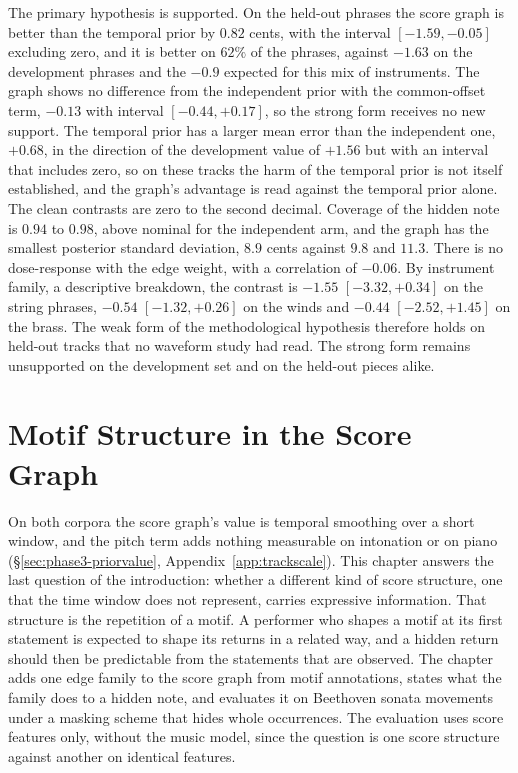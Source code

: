 \documentclass[11pt,a4paper]{report}
\begin{document}
The primary hypothesis is supported. On the held-out phrases the score graph
is better than the temporal prior by $0.82$ cents, with the interval
$[-1.59, -0.05]$ excluding zero, and it is better on $62\%$ of the
phrases, against $-1.63$ on the development phrases and the $-0.9$
expected for this mix of instruments. The graph shows no difference from the independent
prior with the common-offset term, $-0.13$ with interval
$[-0.44, +0.17]$, so the strong form receives no new support. The
temporal prior has a larger mean error than the independent one, $+0.68$,
in the direction of the development value of $+1.56$ but with an interval
that includes zero, so on these tracks the harm of the temporal prior is
not itself established, and the graph's advantage is read against the
temporal prior alone. The clean contrasts are zero to the second decimal.
Coverage of the hidden note is $0.94$ to $0.98$, above nominal for the
independent arm, and the graph has the smallest posterior standard
deviation, $8.9$ cents against $9.8$ and $11.3$. There is no dose-response
with the edge weight, with a correlation of $-0.06$. By instrument family,
a descriptive breakdown, the contrast is $-1.55$ $[-3.32, +0.34]$ on the
string phrases, $-0.54$ $[-1.32, +0.26]$ on the winds and $-0.44$
$[-2.52, +1.45]$ on the brass. The weak form of the
methodological hypothesis therefore holds on held-out tracks that no
waveform study had read. The strong form remains unsupported on the
development set and on the held-out pieces alike.


\chapter{Motif Structure in the Score Graph}\label{ch:motif}
On both corpora the score graph's value is temporal smoothing over a short
window, and the pitch term adds nothing measurable on intonation or on
piano (\S\ref{sec:phase3-priorvalue}, Appendix~\ref{app:trackscale}). This
chapter answers the last question of the introduction: whether a different
kind of score structure, one that the time window does not represent,
carries expressive information. That structure is the repetition of a
motif. A performer who shapes a motif at its first statement is expected to shape
its returns in a related way, and a hidden return should then be
predictable from the statements that are observed. The chapter adds
one edge family to the score graph from motif annotations, states what the
family does to a hidden note, and evaluates it on Beethoven sonata
movements under a masking scheme that hides whole occurrences. The
evaluation uses score
features only, without the music model, since the question is one score
structure against another on identical features.
\end{document}
